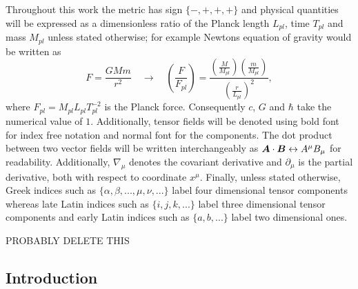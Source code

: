 Throughout this work the metric has sign $\{-,+,+,+\}$ and physical quantities will be expressed as a dimensionless ratio of the Planck length $L_{pl}$, time $T_{pl}$ and mass $M_{pl}$ unless stated otherwise; for example Newtons equation of gravity would be written as
\begin{equation}
F=\frac{GMm}{r^2} \quad \rightarrow \quad\left(\frac{F}{F_{pl}}\right) = \frac{\left(\frac{M}{M_{pl}}\right)  \left(\frac{m}{M_{pl}}\right)}{\left(\frac{r}{L_{pl}}\right)^2},
\end{equation}
where $F_{pl} = M_{pl}L_{pl}T_{pl}^{-2}$ is the Planck force. Consequently $c$, $G$ and $\hbar$ take the numerical value of $1$. Additionally, tensor fields will be denoted using bold font for index free notation and normal font for the components. The dot product between two vector fields will be written interchangeably as $\boldsymbol{A}\cdot\boldsymbol{B}\leftrightarrow A^\mu B_\mu$ for readability. Additionally, $\nabla_\mu$ denotes the covariant derivative and $\partial_\mu$ is the partial derivative, both with respect to coordinate $x^\mu$. Finally, unless stated otherwise, Greek indices such as $\{\alpha, \beta, ..., \mu, \nu, ... \}$ label four dimensional tensor components whereas late Latin indices such as $\{i,j,k,...\}$ label three dimensional tensor components and early Latin indices such as $\{a,b,...\}$ label two dimensional ones.

PROBABLY DELETE THIS




\subsection{Introduction} \label{sect:intro}


